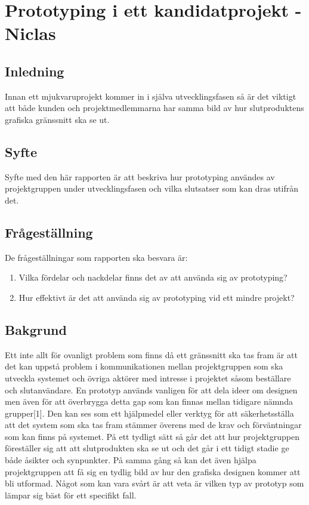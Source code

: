\chapter{Prototyping i ett kandidatprojekt - Niclas}
\section{Inledning}
Innan ett mjukvaruprojekt kommer in i själva utvecklingsfasen så är det viktigt att både kunden och projektmedlemmarna har samma bild av hur slutproduktens grafiska gränssnitt ska se ut. 

\section{Syfte}
Syfte med den här rapporten är att beskriva hur prototyping användes av projektgruppen under utvecklingsfasen och vilka slutsatser som kan dras utifrån det.   

\section{Frågeställning}
De frågeställningar som rapporten ska besvara är:
\begin{enumerate}
	\item Vilka fördelar och nackdelar finns det av att använda sig av prototyping?
	\item Hur effektivt är det att använda sig av prototyping vid ett mindre projekt?
\end{enumerate}

\section{Bakgrund}
Ett inte allt för ovanligt problem som finns då ett gränssnitt ska tas fram är att det kan uppstå problem i kommunikationen mellan projektgruppen som ska utveckla systemet och övriga aktörer med intresse i projektet såsom beställare och slutanvändare. En prototyp används vanligen för att dela ideer om designen men även för att överbrygga detta gap som kan finnas mellan tidigare nämnda grupper[1]. Den kan ses som ett hjälpmedel eller verktyg för att säkerhetsställa att det system som ska tas fram stämmer överens med de krav och förväntningar som kan finns på systemet. På ett tydligt sätt så går det att hur projektgruppen föreställer sig att att slutprodukten ska se ut och det går i ett tidigt stadie ge både åsikter och synpunkter. På samma gång så kan det även hjälpa projektgruppen att få sig en tydlig bild av hur den grafiska designen kommer att bli utformad. Något som kan vara svårt är att veta är vilken typ av prototyp som lämpar sig bäst för ett specifikt fall.

